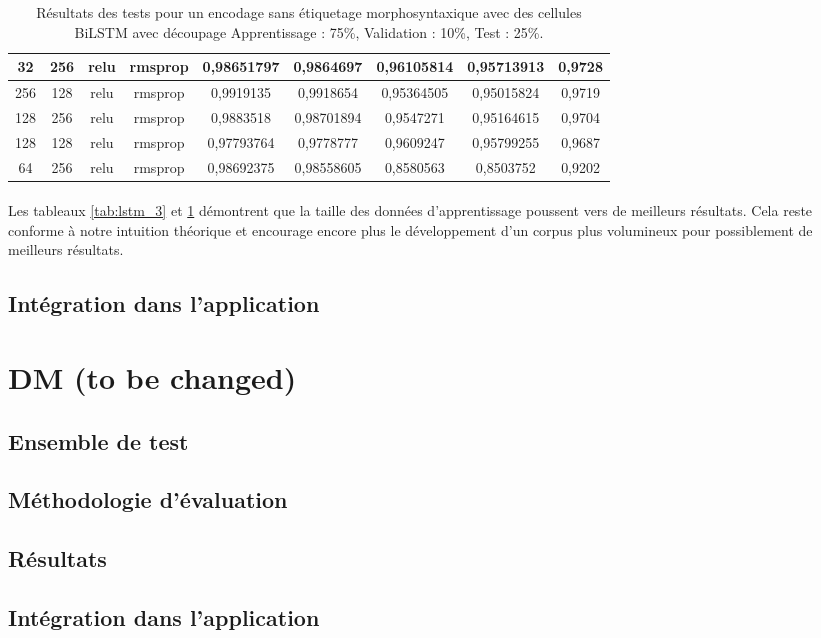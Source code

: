 \begin{table}[H]
{\begin{tabular}{|c|c|c|c|c|c|c|c|c|}
				32 & 256 & relu & rmsprop & 0,98651797 & 0,9864697 & 0,96105814 & 0,95713913 & 0,9728 \\ \hline
				256 & 128 & relu & rmsprop & 0,9919135 & 0,9918654 & 0,95364505 & 0,95015824 & 0,9719 \\ \hline
				128 & 256 & relu & rmsprop & 0,9883518 & 0,98701894 & 0,9547271 & 0,95164615 & 0,9704 \\ \hline
				128 & 128 & relu & rmsprop & 0,97793764 & 0,9778777 & 0,9609247 & 0,95799255 & 0,9687 \\ \hline
				64 & 256 & relu & rmsprop & 0,98692375 & 0,98558605 & 0,8580563 & 0,8503752 & 0,9202 \\ \hline
			\end{tabular}%
		}
		\caption{Résultats des tests pour un encodage sans étiquetage morphosyntaxique avec des cellules BiLSTM avec découpage Apprentissage : 75\%, Validation : 10\%, Test : 25\%.}
		\label{tab:bilstm_3}
	\end{table}
	\paragraph{}
	Les tableaux \ref{tab:lstm_3} et \ref{tab:bilstm_3} démontrent que la taille des données d'apprentissage poussent vers de meilleurs résultats. Cela reste conforme à notre intuition théorique et encourage encore plus le développement d'un corpus plus volumineux pour possiblement de meilleurs résultats.
	\subsection{Intégration dans l'application}

\section{DM (to be changed)}
	\subsection{Ensemble de test}
	\subsection{Méthodologie d'évaluation}
	\subsection{Résultats}
	\subsection{Intégration dans l'application}

